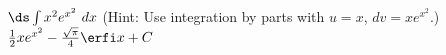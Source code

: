 {$\ds \int x^2e^{x^2}\ dx$ (Hint: Use integration by parts with $u=x$, $dv=xe^{x^2}$.)}
{$\frac{1}{2}x e^{x^2} - \frac{\sqrt{\pi}}{4}\erfi x +C$
}

